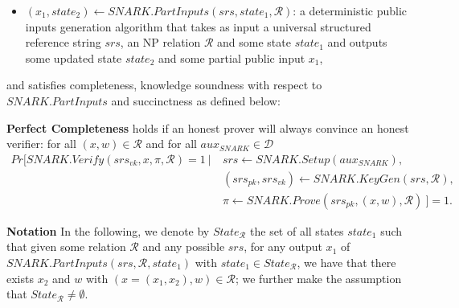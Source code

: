 \begin{dfn}
\begin{itemize}
\item $(x_1, \mathit{state}_2) \leftarrow \mathit{SNARK.PartInputs}(\mathit{srs}, \mathit{state}_1, \mathcal{R})$: a deterministic 
public inputs generation algorithm that takes as input a universal structured reference string $\mathit{srs}$, an NP relation $\mathcal{R}$ and 
some state $\mathit{state}_1$ and outputs some updated state $\mathit{state}_2$ and some partial public input $x_1$,

\end{itemize}
and satisfies completeness, knowledge soundness with respect to $\mathit{SNARK.PartInputs}$ and succinctness as defined below:

\noindent \textbf{Perfect Completeness} holds if an honest prover will always convince an honest verifier: for all  
$(x,w) \in \mathcal{R}$ and for all $\mathit{aux_{\mathit{SNARK}}} \in \mathcal{D}$
\begin{align*}
\mathit{Pr}[\mathit{SNARK.Verify}(\mathit{srs_{vk}}, x, \pi, \mathcal{R}) = 1 \ | \ & 
\mathit{srs} \leftarrow \mathit{SNARK.Setup}(\mathit{aux_{\mathit{SNARK}}}), \\ 
& (\mathit{srs_{pk}}, \mathit{srs_{vk}})\leftarrow \mathit{SNARK.KeyGen}(\mathit{srs}, \mathcal{R}), \\
& \pi \leftarrow \mathit{SNARK.Prove}(\mathit{srs_{pk}}, (x,w), \mathcal{R}) \ ] = 1.
\end{align*}

\noindent \textbf{Notation} In the following, we denote by $\mathit{State_{\mathcal{R}}}$ the set of all states $\mathit{state}_1$ 
such that given some relation $\mathcal{R}$ and any possible $\mathit{srs}$, 
for any output $x_1$ of $\mathit{SNARK.PartInputs}(\mathit{srs}, \mathcal{R}, \mathit{state}_1)$ 
with $\mathit{state_1} \in \mathit{State_{\mathcal{R}}}$, we have that there exists $x_2$ and $w$ with $(x=(x_1, x_2), w) \in \mathcal{R}$; 
we further make the assumption that $\mathit{State_{\mathcal{R}}} \neq \emptyset$.\\


\end{dfn}

